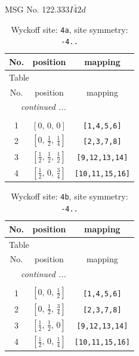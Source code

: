 \documentclass[fleqn,8pt]{jsarticle}
\begin{document}
\setcounter{MaxMatrixCols}{32}

\renewcommand{\tablename}{Table~}
\renewcommand{\figurename}{Figure~}
\begin{center}
\LARGE
MSG No. 122.333\quad$I\bar{4}2d$
\end{center}
\renewcommand{\arraystretch}{1.2}
\begin{longtable}{ccc}
\caption{Wyckoff site: {\tt 4a}, site symmetry: {\tt -4..}}
 \\
 \hline \hline
No. & position & mapping \\ \hline \endfirsthead

\multicolumn{2}{l}{\tablename\ \thetable{}} \\
 \hline \hline
No. & position & mapping \\ \hline \endhead

 \hline \hline
\multicolumn{2}{r}{\footnotesize\it continued ...} \\ \endfoot

 \hline \hline
\multicolumn{2}{r}{} \\ \endlastfoot

1 & $\left[ 0,\, 0,\, 0 \right]$ & {\tt [1,4,5,6]} \\ \hline
2 & $\left[ 0,\, \frac{1}{2},\, \frac{1}{4} \right]$ & {\tt [2,3,7,8]} \\ \hline
3 & $\left[ \frac{1}{2},\, \frac{1}{2},\, \frac{1}{2} \right]$ & {\tt [9,12,13,14]} \\ \hline
4 & $\left[ \frac{1}{2},\, 0,\, \frac{3}{4} \right]$ & {\tt [10,11,15,16]} \\
\end{longtable}
\renewcommand{\arraystretch}{1.2}
\begin{longtable}{ccc}
\caption{Wyckoff site: {\tt 4b}, site symmetry: {\tt -4..}}
 \\
 \hline \hline
No. & position & mapping \\ \hline \endfirsthead

\multicolumn{2}{l}{\tablename\ \thetable{}} \\
 \hline \hline
No. & position & mapping \\ \hline \endhead

 \hline \hline
\multicolumn{2}{r}{\footnotesize\it continued ...} \\ \endfoot

 \hline \hline
\multicolumn{2}{r}{} \\ \endlastfoot

1 & $\left[ 0,\, 0,\, \frac{1}{2} \right]$ & {\tt [1,4,5,6]} \\ \hline
2 & $\left[ 0,\, \frac{1}{2},\, \frac{3}{4} \right]$ & {\tt [2,3,7,8]} \\ \hline
3 & $\left[ \frac{1}{2},\, \frac{1}{2},\, 0 \right]$ & {\tt [9,12,13,14]} \\ \hline
4 & $\left[ \frac{1}{2},\, 0,\, \frac{1}{4} \right]$ & {\tt [10,11,15,16]} \\
\end{longtable}
\end{document}
